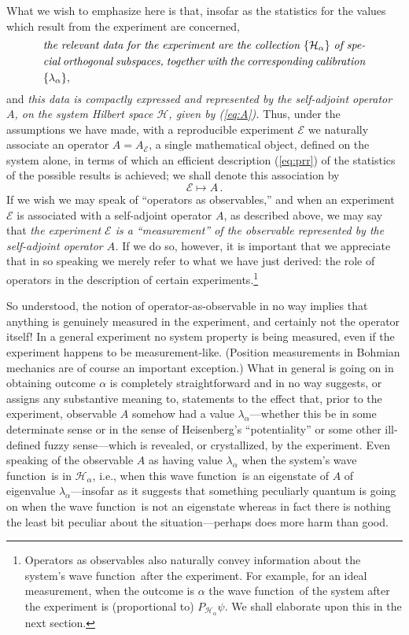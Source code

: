 \documentclass[12pt]{article}
\newcommand{\eq}[1]{(\ref{#1})}
\newcommand{\sa}{self-adjoint}
\newcommand{\BM}{Bohmian mechanics}
\newcommand{\wf}{wave function}
\renewcommand{\a}{\alpha}
\newcommand{\la}{\lambda_{\a}}
\newcommand{\Ha}{{\H}_{\a}}
\renewcommand{\H}{\mbox{$\mathcal{H}$}}
\newcommand{\E}{\mbox{$\mathscr{E}$}}
\begin{document}
What we wish to emphasize here is that, insofar as the statistics for
the values which result {}from the experiment are concerned,
\begin{equation}
\mbox{%
\begin{minipage}{0.85\textwidth}\openup 1.4\jot
   \setlength{\baselineskip}{12pt}\emph{the relevant data for the
     experiment are the collection $\{ \Ha\}$ of special orthogonal
     subspaces, together with the corresponding calibration $\{\la \},$
   }
\end{minipage}}
\label{def:exptoa}
\end{equation}
and \emph{this data is compactly expressed and represented by the
   self-adjoint operator $A$, on the system Hilbert space $\H$, given
   by \eq{eq:A}.} Thus, under the assumptions we have made, with a
reproducible experiment $\E$ we naturally associate an operator
$A=A_{\E}$, a single mathematical object, defined on the system alone,
in terms of which an efficient description \eq{eq:prr} of the
statistics of the possible results is achieved; we shall denote this
association by
%
\begin{equation}
\E\mapsto A\,.
\label{eq:fretoe}
\end{equation}
If we wish we may speak of ``operators as observables,'' and when an
experiment \E{} is associated with a \sa{} operator $A$, as described
above, we may say that \emph{the experiment \E{} is a ``measurement''
   of the observable represented by the \sa{} operator $A$.} If we do
so, however, it is important that we appreciate that in so speaking we
merely refer to what we have just derived: the role of operators in
the description of certain experiments.\footnote{Operators as
   observables also naturally convey information about the system's
   \wf\ after the experiment.  For example, for an ideal measurement,
   when the outcome is $\a$ the \wf\ of the system after the experiment
   is (proportional to) $P_{\H_\a}\psi$.  We shall elaborate upon this
   in the next section.}

So understood, the notion of operator-as-observable in no way implies
that anything is genuinely measured in the experiment, and certainly
not the operator itself!  In a general experiment no system property
is being measured, even if the experiment happens to be
measurement-like.  (Position measurements in \BM{} are of course an
important exception.)  What in general is going on in obtaining
outcome $\alpha$ is completely straightforward and in no way suggests,
or assigns any substantive meaning to, statements to the effect that,
prior to the experiment, observable $A$ somehow had a value
$\lambda_\a$---whether this be in some determinate sense or in the
sense of Heisenberg's ``potentiality'' or some other ill-defined fuzzy
sense---which is revealed, or crystallized, by the experiment.  Even
speaking of the observable $A$ as having value $\lambda_\a$ when the
system's \wf\ is in $\H_\a$, i.e., when this \wf\ is an eigenstate of
$A$ of eigenvalue $\lambda_\a$---insofar as it suggests that something
peculiarly quantum is going on when the \wf\ is not an eigenstate
whereas in fact there is nothing the least bit peculiar about the
situation---perhaps does more harm than good.
\end{document}
